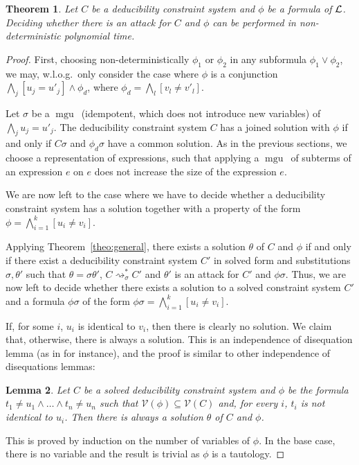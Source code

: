 \documentclass[acmtocl,acmnow]{acmtrans2m}
\newtheorem{theorem}{Theorem}[section]
\newtheorem{lemma}[theorem]{Lemma}
\newcommand{\var}{\mathcal{V}}
\newcommand{\mgu}{\operatorname{mgu}}
\newcommand{\simpl}{\rightsquigarrow}   \newcommand{\msimpl}{\rightsquigarrow}  \newcommand{\gsimpl}{\leadsto}
\newcommand{\logic}{{\cal L}}
\newcommand{\dedsys}[1]{deducibility constraint system}
\begin{document}
\begin{theorem}
Let $C$ be a \dedsys{} and $\phi$ be a formula of $\logic$.
Deciding whether there is an attack for $C$ and $\phi$ can be performed in
non-deterministic polynomial time.
\end{theorem}
\begin{proof}



First, choosing non-deterministically $\phi_1$ or $\phi_2$ in any
subformula $\phi_1\vee \phi_2$, we may, w.l.o.g.~only consider the
case where $\phi$ is a conjunction $\bigwedge_j [u_j = u'_j] \wedge \phi_d$,
where $\phi_d= \bigwedge_l 
[v_l\neq v'_l]$. 






Let $\sigma$ be a $\mgu$~(idempotent, which does not introduce new variables)
of $\bigwedge_j u_j=u'_j$.  
The \dedsys{} $C$ has a joined solution with $\phi$ if and only if
$C\sigma$ and $\phi_d\sigma$ have a common solution. As in the previous sections,
we choose a representation of expressions, such that applying a $\mgu$~of
subterms of an expression $e$ on $e$ does not increase the size of the expression $e$. 

We are now left to the case where we have to decide whether a
\dedsys{} has a solution together with a property of the form
$\phi = \bigwedge_{i=1}^k [u_i\neq   v_i]$.



Applying Theorem~\ref{theo:general},  there exists
a solution $\theta$ of $C$ and $\phi$ 
if and only if there exist a \dedsys{} $C'$ in solved form
  and  substitutions $\sigma,\theta'$ such that $\theta
  =\sigma\theta'$, $C\simpl^*_{\sigma} C'$ and $\theta'$ is an attack for $C'$ 
and $\phi\sigma$. 
Thus, we are now left to decide whether there exists a solution to
a solved constraint system $C'$ and a formula $\phi\sigma$ of the form
$\phi\sigma = \bigwedge_{i=1}^k [u_i\neq   v_i]$.







If, for some $i$, $u_i$ is identical to $v_i$, then there is clearly no
solution. We claim that, otherwise, there is always a solution. This
is an independence of disequation lemma (as in \cite{colmerauer84} for instance),
and the proof is similar to other independence of disequations lemmas:


\begin{lemma}
Let $C$ be a solved \dedsys{} and $\phi$ be the formula $t_1\neq u_1
\wedge \ldots \wedge t_n\neq u_n$
such that $\var(\phi)\subseteq \var(C)$ and, for every $i$, $t_i$ is not identical to $u_i$. Then  there is always a solution
$\theta$ of $C$ and $\phi$.
\end{lemma}
This is proved by induction on the number of variables of $\phi$.
In the base case, there is no variable and the result is trivial as $\phi$ is
a tautology.


\end{proof}
\end{document}
